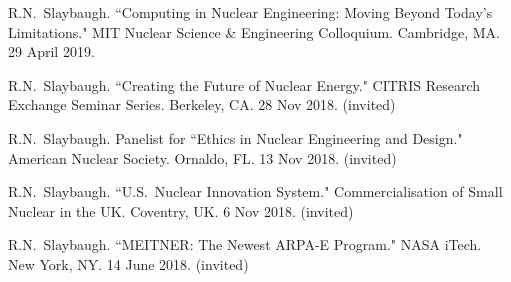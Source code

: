 \begin{bibsection}



\item R.N.\ Slaybaugh. ``Computing in Nuclear Engineering: Moving Beyond Today's Limitations." MIT Nuclear Science \& Engineering Colloquium. Cambridge, MA. 29 April 2019.



\item R.N.\ Slaybaugh. ``Creating the Future of Nuclear Energy." CITRIS Research Exchange Seminar Series. Berkeley, CA. 28 Nov 2018. (invited)


\item R.N.\ Slaybaugh. Panelist for ``Ethics in Nuclear Engineering and Design." American Nuclear Society. Ornaldo, FL. 13 Nov 2018. (invited)

\item R.N.\ Slaybaugh.  ``U.S.\ Nuclear Innovation System." Commercialisation of Small Nuclear in the UK. Coventry, UK. 6 Nov 2018. (invited)

\item R.N.\ Slaybaugh.  ``MEITNER: The Newest ARPA-E Program." NASA iTech. New York, NY. 14 June 2018. (invited)


\end{bibsection}
